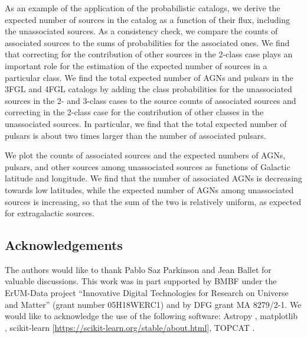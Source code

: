 As an example of the application of the probabilistic catalogs, we derive the expected number of sources in the catalog as a function of their flux, including the unassociated sources.
As a consistency check, we compare the counts of associated sources to the sums of probabilities for the associated ones.
We find that correcting for the contribution of other sources in the 2-class case plays an important role for the estimation of the expected number of sources in a particular class.
We find the total expected number of AGNs and pulsars in the 3FGL and 4FGL catalogs by adding the class probabilities for the unassociated sources in the 2- and 3-class cases to the source counts of associated sources and correcting in the 2-class case for the contribution of other classes in the unassociated sources.
In particular, we find that the total expected number of pulsars is about two times larger than the number of associated pulsars.

We plot the counts of associated sources and the expected numbers of AGNs, pulsars, and other sources among unassociated sources
as functions of Galactic latitude and longitude.
We find that the number of associated AGNs is decreasing towards low latitudes, while the expected number of AGNs among unassociated sources is increasing, so that the sum of the two is relatively uniform, as expected for extragalactic sources.


\subsection*{Acknowledgements}

The authors would like to thank Pablo Saz Parkinson and Jean Ballet for valuable discussions.
This work was in part supported by BMBF under the ErUM-Data project ``Innovative Digital Technologies for Research on Universe and Matter'' (grant number 05H18WERC1) and by DFG grant MA 8279/2-1.
We would like to acknowledge the use of the following software:
Astropy \citep[\url{http://www.astropy.org},][]{2013A&A...558A..33A}, 
matplotlib \citep{Hunter:2007}, 
scikit-learn [\url{https://scikit-learn.org/stable/about.html}], 
TOPCAT \citep{2005ASPC..347...29T}.
